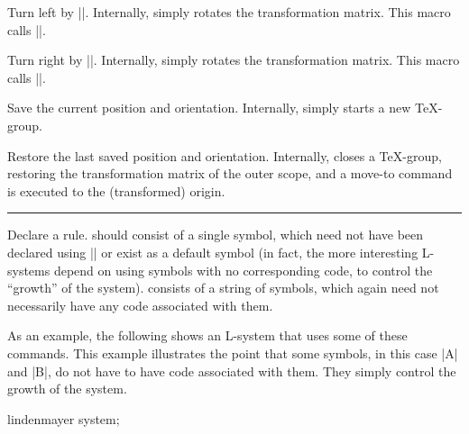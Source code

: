 \begin{command}{\pgfdeclarelindenmayersystem{}}
\begin{command}{\symbol{}}
        \begin{command}{\pgflsystemturnleft}
            Turn left by |\pgflsystemcurrentleftangle|. Internally, \pgfname{}
            simply rotates the transformation matrix. This macro calls
            |\pgflsystemrandomizeleftangle|.
        \end{command}

        \begin{command}{\pgflsystemturnright}
            Turn right by |\pgflsystemcurrentrightangle|. Internally,
            \pgfname{} simply rotates the transformation matrix. This macro
            calls |\pgflsystemrandomizerightangle|.
        \end{command}

        \begin{command}{\pgflsystemsavestate}
            Save the current position and orientation. Internally, \pgfname{}
            simply starts a new \TeX-group.
        \end{command}

        \begin{command}{\pgflsystemrestorestate}
            Restore the last saved position and orientation. Internally,
            \pgfname{} closes a \TeX-group, restoring the transformation matrix
            of the outer scope, and a move-to command is executed to the
            (transformed) origin.
        \end{command}
    \end{command}

    \begin{command}{\rule{\ttfamily\char`\{}}
        Declare a rule.  should consist of a single symbol, which
        need not have been declared using |\symbol| or exist as a default
        symbol (in fact, the more interesting L-systems depend on using symbols
        with no corresponding code, to control the ``growth'' of the system).
         consists of a string of symbols, which again need not
        necessarily have any code associated with them.
    \end{command}

    As an example, the following shows an L-system that uses some of these
    commands. This example illustrates the point that some symbols, in this
    case |A| and |B|, do not have to have code associated with them. They
    simply control the growth of the system.
\begin{codeexample}[
    preamble={\usetikzlibrary{lindenmayersystems}},
    pre={\nullfont\expandafter\let\csname pgf@lsystem@Hilbert curve\endcsname=\relax},
]
\tikz\draw[lindenmayer system={Hilbert curve, axiom=A, order=4, angle=90}]
  lindenmayer system;
\end{codeexample}
\end{command}


